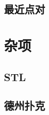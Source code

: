 \documentclass[a4paper]{article}
\begin{document}
\begin{multicols}{2}
			\subsection{最近点对}
				

		\section{杂项}
			\subsection{STL}
				
			
			\subsection{德州扑克}
				

	\end{multicols}

	

	


\end{document}
